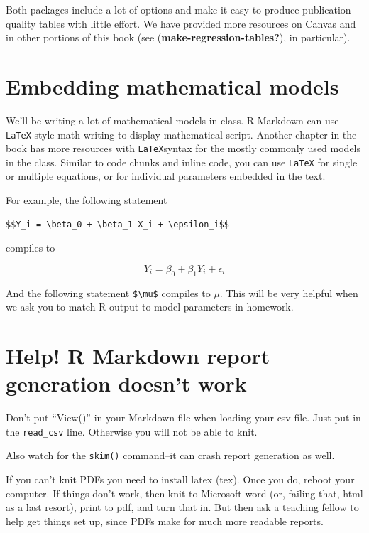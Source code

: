 \documentclass[
  letterpaper,
  DIV=11,
  numbers=noendperiod]{scrreprt}
\begin{document}
Both packages include a lot of options and make it easy to produce
publication-quality tables with little effort. We have provided more
resources on Canvas and in other portions of this book (see
(\textbf{make-regression-tables?}), in particular).

\hypertarget{embedding-mathematical-models}{%
\section{Embedding mathematical
models}\label{embedding-mathematical-models}}

We'll be writing a lot of mathematical models in class. R Markdown can
use \texttt{LaTeX} style math-writing to display mathematical script.
Another chapter in the book has more resources with \texttt{LaTeX}syntax
for the mostly commonly used models in the class. Similar to code chunks
and inline code, you can use \texttt{LaTeX} for single or multiple
equations, or for individual parameters embedded in the text.

For example, the following statement

\begin{verbatim}
$$Y_i = \beta_0 + \beta_1 X_i + \epsilon_i$$
\end{verbatim}

compiles to

\[Y_i = \beta_0 + \beta_1 Y_i + \epsilon_i\]

And the following statement \texttt{\$\textbackslash{}mu\$} compiles to
\(\mu\). This will be very helpful when we ask you to match R output to
model parameters in homework.

\hypertarget{help-r-markdown-report-generation-doesnt-work}{%
\section{Help! R Markdown report generation doesn't
work}\label{help-r-markdown-report-generation-doesnt-work}}

Don't put ``View()'' in your Markdown file when loading your csv file.
Just put in the \texttt{read\_csv} line. Otherwise you will not be able
to knit.

Also watch for the \texttt{skim()} command--it can crash report
generation as well.

If you can't knit PDFs you need to install latex (tex). Once you do,
reboot your computer. If things don't work, then knit to Microsoft word
(or, failing that, html as a last resort), print to pdf, and turn that
in. But then ask a teaching fellow to help get things set up, since PDFs
make for much more readable reports.
\end{document}
